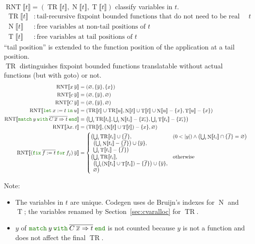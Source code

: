 \documentclass[a4paper,fleqn]{article}
\def\codegen{\textrm{Codegen}}
\newcommand{\kwlet}{\mbox{\color{mygreen}\ttfamily let}}
\newcommand{\kwin}{\mbox{\color{mygreen}\ttfamily in}}
\newcommand{\kwmatch}{\mbox{\color{mygreen}\ttfamily match}}
\newcommand{\kwwith}{\mbox{\color{mygreen}\ttfamily with}}
\newcommand{\kwend}{\mbox{\color{mygreen}\ttfamily end}}
\newcommand{\kwfix}{\mbox{\color{mygreen}\ttfamily fix}}
\newcommand{\kwfor}{\mbox{\color{mygreen}\ttfamily for}}
\newcommand{\lam}[2]{\lambda #1.\:#2}
\newcommand{\letin}[3]{\kwlet\:#1:=#2\:\kwin\:#3}
\newcommand{\omatch}[2]{\kwmatch\:#1\:\kwwith\:{#2}\:\kwend}
\newcommand{\ofix}[2]{\kwfix\:{#1}\:\kwfor\:{#2}}
\newcommand{\tbigcup}{{\textstyle\bigcup}}
\newcommand{\BRA}[1]{\llbracket #1 \rrbracket}
\DeclareMathOperator{\TRop}{TR}
\newcommand{\TR}[1]{\TRop\BRA{#1}}
\DeclareMathOperator{\RNTop}{RNT}
\newcommand{\RNT}[1]{\RNTop\BRA{#1}}
\DeclareMathOperator{\Nop}{N}
\DeclareMathOperator{\Top}{T}
\newcommand{\N}[1]{\Nop\BRA{#1}}
\newcommand{\T}[1]{\Top\BRA{#1}}
\newcommand{\kwgoto}{\mbox{\color{myviolet}\ttfamily goto}}
\newcommand{\secref}[1]{Section~\ref{#1}}
\newcommand{\rep}[1]{\overline{#1}}
\begin{document}
$\RNT{t} = (\TR{t}, \N{t}, \T{t})$ classify variables in $t$.
\begin{align*}
  \TR{t} &: \text{tail-recursive fixpoint bounded functions that do not need to be real functions in $t$} \\
  \N{t} &: \text{free variables at non-tail positions of $t$} \\
  \T{t} &: \text{free variables at tail positions of $t$}
\end{align*}
``tail position'' is extended to the function position of the application at a tail position. \\
$\TRop$ distinguishes fixpoint bounded functions translatable without actual functions (but with \kwgoto{}) or not.
\begin{align*}
  \RNT{x\:\rep{y}} &= (\varnothing, \{\rep{y}\}, \{x\}) \\
  \RNT{c\:\rep{y}} &= (\varnothing, \{\rep{y}\}, \varnothing) \\
  \RNT{C\:\rep{y}} &= (\varnothing, \{\rep{y}\}, \varnothing) \\
  \RNT{\letin{x}{t}{u}} &= (\TR{t} \cup \TR{u}, \N{t} \cup \T{t} \cup \N{u} - \{x\}, \T{u} - \{x\}) \\
  \RNT{\omatch{y}{\rep{C\:\rep{x}\Rightarrow t}}} &= \bigl(\tbigcup_i \TR{t_i}, \tbigcup_i \N{t_i} - \{\rep{x_i}\}, \tbigcup_i \T{t_i} - \{\rep{x_i}\} \bigr) \\
  \RNT{\lam{x}{t}} &= (\TR{t}, (\N{t} \cup \T{t}) - \{x\}, \varnothing) \\
  \RNT{(\ofix{\rep{f:=t}}{f_j})\:\rep{y}} &=
    \begin{cases}
      \begin{aligned}[t]
        \bigl(& \tbigcup_i \TR{t_i} \cup \{\rep{f}\}, \\
              & \bigl(\tbigcup_i \N{t_i} - \{\rep{f}\}\bigr) \cup \{\rep{y}\}, \\
              & \tbigcup_i \T{t_i} - \{\rep{f}\} \bigr)
      \end{aligned}
        & (0 < |y|) \wedge \bigl(\tbigcup_i \N{t_i} \cap \{\rep{f}\} = \varnothing\bigr) \\
      \begin{aligned}[t]
        \bigl(& \tbigcup_i \TR{t_i}, \\
              & \bigl(\tbigcup_i (\N{t_i} \cup \T{t_i}) - \{\rep{f}\}\bigr) \cup \{\rep{y}\}, \\
              & \varnothing \bigr)
      \end{aligned}
        & \text{otherwise}
    \end{cases}
\end{align*}
{\small Note:
\begin{itemize}
  \item The variables in $t$ are unique.
    \codegen{} uses de Bruijn's indexes for $\Nop$ and $\Top$;
    the variables renamed by \secref{sec:cvaralloc} for $\TRop$.
  \item $y$ of $\omatch{y}{\rep{C\:\rep{x}\Rightarrow t}}$ is not counted because $y$ is not a function and does not affect the final $\TRop$.
\end{itemize}}
\end{document}
